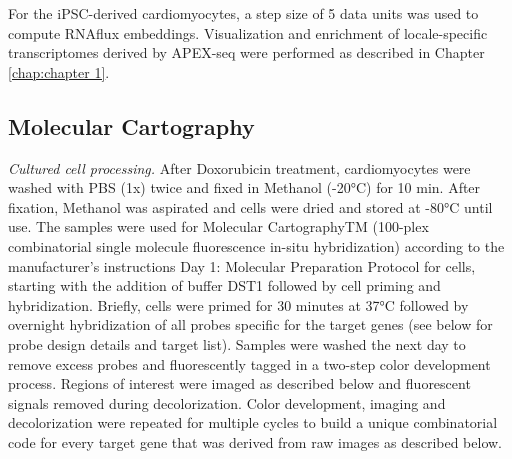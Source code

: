 For the iPSC-derived cardiomyocytes, a step size of 5 data units was used to compute RNAflux embeddings. Visualization and enrichment of locale-specific transcriptomes derived by APEX-seq were performed as described in Chapter \ref{chap:chapter 1}.

\subsection{Molecular Cartography}
\textit{Cultured cell processing.} After Doxorubicin treatment, cardiomyocytes were washed with PBS (1x) twice and fixed in Methanol (-20°C) for 10 min. After fixation, Methanol was aspirated and cells were dried and stored at -80°C until use. The samples were used for Molecular CartographyTM (100-plex combinatorial single molecule fluorescence in-situ hybridization) according to the manufacturer’s instructions Day 1: Molecular Preparation Protocol for cells,  starting with the addition of buffer DST1  followed by cell priming and hybridization. Briefly, cells were primed for 30 minutes at 37°C followed by overnight hybridization of all probes specific for the target genes (see below for probe design details and target list). Samples were washed the next day to remove excess probes and fluorescently tagged in a two-step color development process. Regions of interest were imaged as described below and fluorescent signals removed during decolorization. Color development, imaging and decolorization were repeated for multiple cycles to build a unique combinatorial code for every target gene that was derived from raw images as described below.
